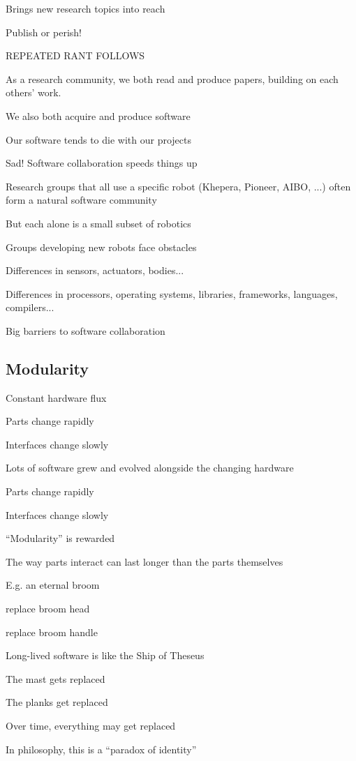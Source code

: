 Brings new research topics into reach

Publish or perish!

REPEATED RANT FOLLOWS

As a research community, we both read and produce papers, building on
each others' work.

We also both acquire and produce software

Our software tends to die with our projects

Sad!  Software collaboration speeds things up

Research groups that all use a specific robot (Khepera, Pioneer, AIBO,
...) often form a natural software community

But each alone is a small subset of robotics

Groups developing new robots face obstacles

Differences in sensors, actuators, bodies...

Differences in processors, operating systems, libraries, frameworks,
languages, compilers...

Big barriers to software collaboration




\subsection{Modularity}

Constant hardware flux

Parts change rapidly

Interfaces change slowly

Lots of software grew and evolved alongside the changing hardware

Parts change rapidly

Interfaces change slowly

``Modularity'' is rewarded


The way parts interact can last longer than the parts themselves

E.g. an eternal broom

replace broom head

replace broom handle


Long-lived software is like the Ship of Theseus

The mast gets replaced

The planks get replaced

Over time, everything may get replaced

In philosophy, this is a ``paradox of identity''

